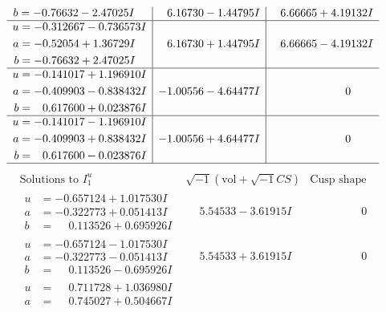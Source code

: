 \documentclass[1p]{elsarticle_modified}
\theoremstyle{definition}
\newcommand{\I}{\sqrt{-1}}
\begin{document}
$$\begin{array}{c|c|c}
\begin{aligned}
b &= -0.76632 - 2.47025 I\end{aligned}
 & \phantom{-}6.16730 - 1.44795 I & \phantom{-}6.66665 + 4.19132 I \\ \hline\begin{aligned}
u &= -0.312667 - 0.736573 I \\
a &= -0.52054 + 1.36729 I \\
b &= -0.76632 + 2.47025 I\end{aligned}
 & \phantom{-}6.16730 + 1.44795 I & \phantom{-}6.66665 - 4.19132 I \\ \hline\begin{aligned}
u &= -0.141017 + 1.196910 I \\
a &= -0.409903 - 0.838432 I \\
b &= \phantom{-}0.617600 + 0.023876 I\end{aligned}
 & -1.00556 - 4.64477 I & \phantom{-0.000000 } 0 \\ \hline\begin{aligned}
u &= -0.141017 - 1.196910 I \\
a &= -0.409903 + 0.838432 I \\
b &= \phantom{-}0.617600 - 0.023876 I\end{aligned}
 & -1.00556 + 4.64477 I & \phantom{-0.000000 } 0\\
 \hline 
 \end{array}$$\newpage$$\begin{array}{c|c|c}  
\text{Solutions to }I^u_{1}& \I (\text{vol} + \sqrt{-1}CS) & \text{Cusp shape}\\
 \hline 
\begin{aligned}
u &= -0.657124 + 1.017530 I \\
a &= -0.322773 + 0.051413 I \\
b &= \phantom{-}0.113526 + 0.695926 I\end{aligned}
 & \phantom{-}5.54533 - 3.61915 I & \phantom{-0.000000 } 0 \\ \hline\begin{aligned}
u &= -0.657124 - 1.017530 I \\
a &= -0.322773 - 0.051413 I \\
b &= \phantom{-}0.113526 - 0.695926 I\end{aligned}
 & \phantom{-}5.54533 + 3.61915 I & \phantom{-0.000000 } 0 \\ \hline\begin{aligned}
u &= \phantom{-}0.711728 + 1.036980 I \\
a &= \phantom{-}0.745027 + 0.504667 I \\

\end{aligned}
\end{array}$$
\end{document}
